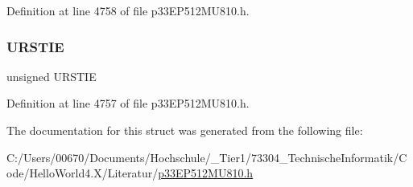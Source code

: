 Definition at line 4758 of file p33\+E\+P512\+M\+U810.\+h.

\mbox{\label{structtag_u1_i_e_b_i_t_s_a05e9afc9e0f21fd49c3288106894f01c}} 
\subsubsection{\texorpdfstring{U\+R\+S\+T\+IE}{URSTIE}}
{\footnotesize\ttfamily unsigned U\+R\+S\+T\+IE}



Definition at line 4757 of file p33\+E\+P512\+M\+U810.\+h.



The documentation for this struct was generated from the following file\+:\begin{DoxyCompactItemize}
\item 
C\+:/\+Users/00670/\+Documents/\+Hochschule/\+\_\+\+Tier1/73304\+\_\+\+Technische\+Informatik/\+Code/\+Hello\+World4.\+X/\+Literatur/\hyperlink{p33_e_p512_m_u810_8h}{p33\+E\+P512\+M\+U810.\+h}\end{DoxyCompactItemize}
